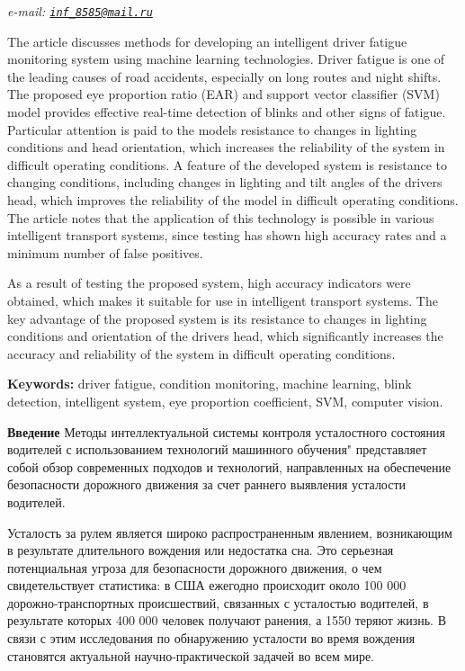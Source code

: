 \documentclass[
]{article}
\begin{document}
\emph{e-mail:
\href{mailto:inf_8585@mail.ru}{\nolinkurl{inf\_8585@mail.ru}}}

The article discusses methods for developing an intelligent driver
fatigue monitoring system using machine learning technologies. Driver
fatigue is one of the leading causes of road accidents, especially on
long routes and night shifts. The proposed eye proportion ratio (EAR)
and support vector classifier (SVM) model provides effective real-time
detection of blinks and other signs of fatigue. Particular attention is
paid to the model\textquotesingle s resistance to changes in lighting
conditions and head orientation, which increases the reliability of the
system in difficult operating conditions. A feature of the developed
system is resistance to changing conditions, including changes in
lighting and tilt angles of the driver\textquotesingle s head, which
improves the reliability of the model in difficult operating conditions.
The article notes that the application of this technology is possible in
various intelligent transport systems, since testing has shown high
accuracy rates and a minimum number of false positives.

As a result of testing the proposed system, high accuracy indicators
were obtained, which makes it suitable for use in intelligent transport
systems. The key advantage of the proposed system is its resistance to
changes in lighting conditions and orientation of the
driver\textquotesingle s head, which significantly increases the
accuracy and reliability of the system in difficult operating
conditions.

\textbf{Keywords:} driver fatigue, condition monitoring, machine
learning, blink detection, intelligent system, eye proportion
coefficient, SVM, computer vision.

\textbf{Введение} Методы интеллектуальной системы контроля усталостного
состояния водителей с использованием технологий машинного обучения"
представляет собой обзор современных подходов и технологий, направленных
на обеспечение безопасности дорожного движения за счет раннего выявления
усталости водителей.

Усталость за рулем является широко распространенным явлением,
возникающим в результате длительного вождения или недостатка сна. Это
серьезная потенциальная угроза для безопасности дорожного движения, о
чем свидетельствует статистика: в США ежегодно происходит около 100 000
дорожно-транспортных происшествий, связанных с усталостью водителей, в
результате которых 400 000 человек получают ранения, а 1550 теряют
жизнь. В связи с этим исследования по обнаружению усталости во время
вождения становятся актуальной научно-практической задачей во всем мире.
\end{document}

